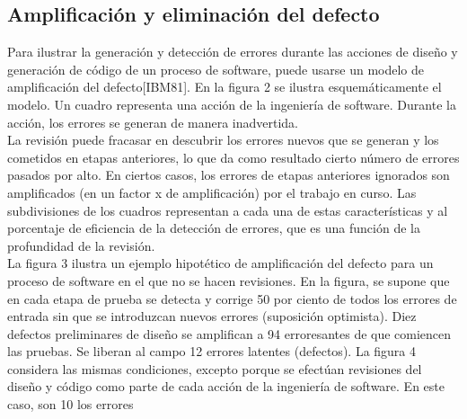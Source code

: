 \subsection{Amplificación y eliminación del defecto}
Para ilustrar la generación y detección de errores durante las acciones de diseño y generación de código de un proceso de software, puede usarse un modelo de amplificación del defecto[IBM81]. En la figura 2 se ilustra esquemáticamente el modelo. Un cuadro representa una acción de la ingeniería de software. Durante la acción, los errores se generan de manera inadvertida.\\
La revisión puede fracasar en descubrir los errores nuevos que se generan y los cometidos en etapas anteriores, lo que da como resultado cierto número de errores pasados por alto. En ciertos casos, los errores de etapas anteriores ignorados son amplificados (en un factor x de amplificación) por el trabajo en curso. Las subdivisiones de los cuadros representan a cada una de estas características y al porcentaje de eficiencia de la detección de errores, que es una función de la profundidad de la revisión.\\
La figura 3 ilustra un ejemplo hipotético de amplificación del defecto para un proceso de software en el que no se hacen revisiones. En la figura, se supone que en cada etapa de prueba se detecta y corrige 50 por ciento de todos los errores de entrada sin que se introduzcan nuevos errores (suposición optimista). Diez defectos preliminares de diseño se amplifican a 94 erroresantes de que comiencen las pruebas. Se liberan al campo 12 errores latentes (defectos). La figura 4 considera las mismas condiciones, excepto porque se efectúan revisiones del diseño y código como parte de cada acción de la ingeniería de software. En este caso, son 10 los errores
